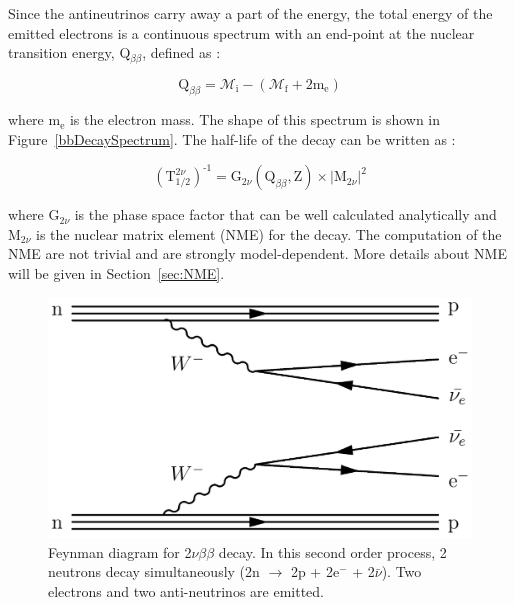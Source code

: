 \documentclass[main.tex]{subfiles}
\begin{document}
\bigskip


\NI Since the antineutrinos carry away a part of the energy, the total energy of the emitted electrons is a continuous spectrum with an end-point at the nuclear transition energy, Q$_{\beta\beta}$, defined as :


\begin{equation}
\text{Q}_{\beta\beta} = \mathcal{M}_\text{i} - (\mathcal{M}_\text{f} + \text{2m}_\text{e})
\end{equation}


\bigskip


\NI where m$_\text{e}$ is the electron mass. The shape of this spectrum is shown in Figure~\ref{bbDecaySpectrum}. The half-life of the decay can be written as : 


\begin{equation}
(\text{T}_{\text{1/2}}^{\text{2}\nu})^{\text{-1}} = \text{G}_{\text{2}\nu}(\text{Q}_{\beta\beta}, \text{Z}) \times |\text{M}_{\text{2}\nu}|^\text{2}
\end{equation}


\bigskip


\NI where G$_{\text{2}\nu}$ is the phase space factor that can be well calculated analytically and M$_{\text{2}\nu}$ is the nuclear matrix element (NME) for the decay. The computation of the NME are not trivial and are strongly model-dependent. More details about NME will be given in Section~\ref{sec:NME}.



\begin{figure}[h!]
\begin{center}
\includegraphics[scale=0.18]{pictures/Chap2/2nubb_Feynman.png}
\caption{Feynman diagram for 2$\nu\beta\beta$ decay. In this second order process, 2 neutrons decay simultaneously (2n $\rightarrow$ 2p + 2e$^-$ + 2$\bar{\nu}$). Two electrons and two anti-neutrinos are emitted.}
\label{2nubbFeynman}
\end{center}
\end{figure}
\end{document}
